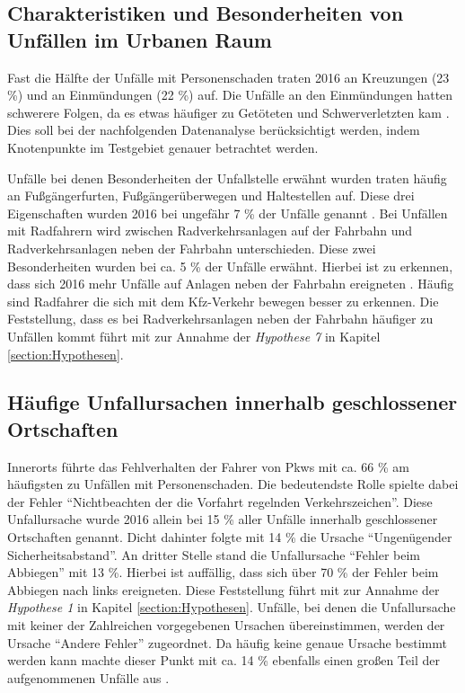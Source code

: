 \subsection{Charakteristiken und Besonderheiten von Unfällen im Urbanen Raum}
Fast die Hälfte der Unfälle mit Personenschaden traten 2016 an Kreuzungen (23 \%) und an Einmündungen (22 \%) auf. Die Unfälle an den Einmündungen hatten schwerere Folgen, da es etwas häufiger zu Getöteten und Schwerverletzten kam \parencite[S. 88]{StatistischesBundesamt.2017}. Dies soll bei der nachfolgenden Datenanalyse berücksichtigt werden, indem Knotenpunkte im Testgebiet genauer betrachtet werden.

Unfälle bei denen Besonderheiten der Unfallstelle erwähnt wurden traten häufig an Fußgängerfurten, Fußgängerüberwegen und Haltestellen auf. Diese drei Eigenschaften wurden 2016 bei ungefähr 7 \% der Unfälle genannt \parencite[S. 88]{StatistischesBundesamt.2017}. Bei Unfällen mit Radfahrern wird zwischen Radverkehrsanlagen auf der Fahrbahn und Radverkehrsanlagen neben der Fahrbahn unterschieden. Diese zwei Besonderheiten wurden bei ca. 5 \% der Unfälle erwähnt. Hierbei ist zu erkennen, dass sich 2016 mehr Unfälle auf Anlagen neben der Fahrbahn ereigneten \parencite[S. 88]{StatistischesBundesamt.2017}. Häufig sind Radfahrer die sich mit dem Kfz-Verkehr bewegen besser zu erkennen. Die Feststellung, dass es bei Radverkehrsanlagen neben der Fahrbahn häufiger zu Unfällen kommt führt mit zur Annahme der \textit{Hypothese 7} in Kapitel \ref{section:Hypothesen}.

\subsection{Häufige Unfallursachen innerhalb geschlossener Ortschaften}\label{chapter:Unfallursachen innerorts}
Innerorts führte das Fehlverhalten der Fahrer von Pkws mit ca. 66 \% am häufigsten zu Unfällen mit Personenschaden. Die bedeutendste Rolle spielte dabei der Fehler \enquote{Nichtbeachten der die Vorfahrt regelnden Verkehrszeichen}. Diese Unfallursache wurde 2016 allein bei 15 \% aller Unfälle innerhalb geschlossener Ortschaften genannt. Dicht dahinter folgte mit 14 \% die Ursache \enquote{Ungenügender Sicherheitsabstand}. An dritter Stelle stand die Unfallursache \enquote{Fehler beim Abbiegen} mit 13 \%. Hierbei ist auffällig, dass sich über 70 \% der Fehler beim Abbiegen nach links ereigneten. Diese Feststellung führt mit zur Annahme der \textit{Hypothese 1} in Kapitel \ref{section:Hypothesen}. Unfälle, bei denen die Unfallursache mit keiner der Zahlreichen vorgegebenen Ursachen übereinstimmen, werden der Ursache \enquote{Andere Fehler} zugeordnet. Da häufig keine genaue Ursache bestimmt werden kann machte dieser Punkt mit ca. 14 \% ebenfalls einen großen Teil der aufgenommenen Unfälle aus \parencite[S. 274-277]{StatistischesBundesamt.2018b}.

